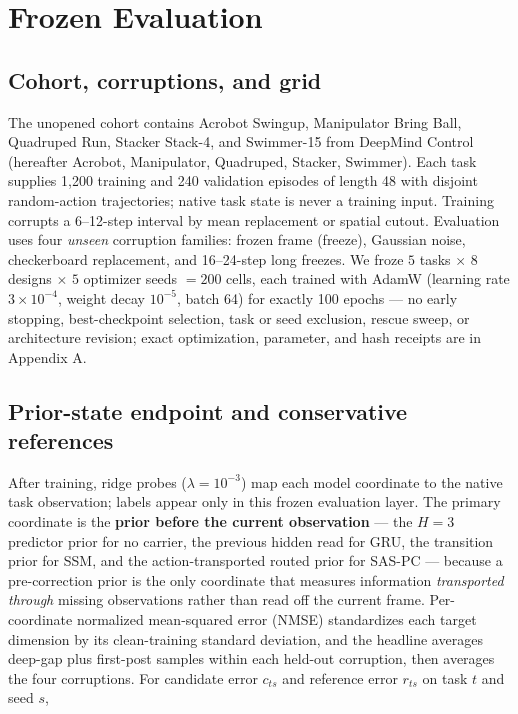 \section{Frozen Evaluation}\label{frozen-evaluation}

\subsection{Cohort, corruptions, and
grid}\label{cohort-corruptions-and-grid}

The unopened cohort contains Acrobot Swingup, Manipulator Bring Ball,
Quadruped Run, Stacker Stack-4, and Swimmer-15 from DeepMind Control
\citep{ref18} (hereafter Acrobot, Manipulator, Quadruped, Stacker,
Swimmer). Each task supplies 1,200 training and 240 validation episodes
of length 48 with disjoint random-action trajectories; native task state
is never a training input. Training corrupts a 6--12-step interval by
mean replacement or spatial cutout. Evaluation uses four \emph{unseen}
corruption families: frozen frame (freeze), Gaussian noise, checkerboard
replacement, and 16--24-step long freezes. We froze \(5\) tasks
\(\times\) \(8\) designs \(\times\) \(5\)
optimizer seeds \(=200\) cells, each trained with AdamW (learning
rate \(3{\times}10^{-4}\), weight decay \(10^{-5}\), batch 64) for exactly
100 epochs --- no early stopping, best-checkpoint selection, task or
seed exclusion, rescue sweep, or architecture revision; exact
optimization, parameter, and hash receipts are in Appendix A.

\subsection{Prior-state endpoint and conservative
references}\label{prior-state-endpoint-and-conservative-references}

After training, ridge probes (\(\lambda=10^{-3}\)) map each model coordinate
to the native task observation; labels appear only in this frozen
evaluation layer. The primary coordinate is the \textbf{prior before the
current observation} --- the \(H=3\) predictor prior for no
carrier, the previous hidden read for GRU, the transition prior for SSM,
and the action-transported routed prior for SAS-PC --- because a
pre-correction prior is the only coordinate that measures information
\emph{transported through} missing observations rather than read off the
current frame. Per-coordinate normalized mean-squared error (NMSE)
standardizes each target dimension by its clean-training standard
deviation, and the headline averages deep-gap plus first-post samples
within each held-out corruption, then averages the four corruptions. For
candidate error \(c_{ts}\) and reference error \(r_{ts}\) on task
\(t\) and seed \(s\),

